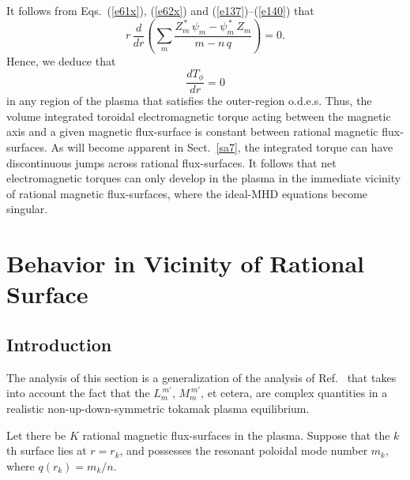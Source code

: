 \documentclass[12pt,prb,aps]{revtex4-1}
\begin{document}
 It follows from Eqs.~(\ref{e61x}), (\ref{e62x}) and (\ref{e137})--(\ref{e140}) that
\begin{equation}\label{e141c}
r\,\frac{d}{dr}\!\left(\sum_{m} \frac{Z_m^{\,\ast}\,\psi_m-\psi_m^{\,\ast}\,Z_m}{m-n\,q}\right)= 0.
\end{equation}
Hence, we deduce that\,\cite{am1}
\begin{equation}\label{etcons}
\frac{dT_\phi}{dr}=0
\end{equation}
in any region of the plasma that satisfies the outer-region o.d.e.s. Thus, the volume integrated toroidal electromagnetic torque acting between the
magnetic axis and a given magnetic flux-surface is
constant between rational magnetic flux-surfaces. As will become apparent in Sect.~\ref{sa7}, the integrated torque can have discontinuous jumps across rational flux-surfaces. It follows that
net electromagnetic torques can only develop in the plasma in the immediate vicinity of rational magnetic flux-surfaces, where the ideal-MHD equations  become singular. \cite{rfa}

\section{Behavior in Vicinity of Rational Surface}\label{snus}
\subsection{Introduction}
The analysis of this section is a generalization of the analysis of Ref.~ that takes into
account the fact that the $L_m^{\,m'}$, $M_m^{\,m'}$, et cetera, are complex quantities in a realistic non-up-down-symmetric tokamak
plasma equilibrium.

Let there be $K$ rational magnetic flux-surfaces in the plasma. Suppose that the $k$th surface lies at $r=r_k$, and possesses the resonant
poloidal mode number $m_k$, where $q(r_k)=m_k/n$.   
\end{document}
